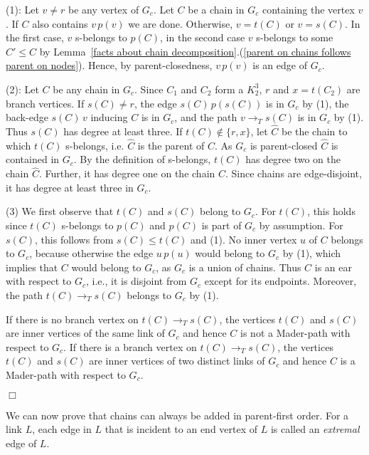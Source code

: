 \documentclass[paper=a4]{scrartcl}
\newcommand{\qed}{}
\newcommand{\mqed}{\hfill$\Box$}
\newlength{\proofpostskipamount}\newlength{\proofpreskipamount}
\newenvironment{proof}{\par\vspace{\proofpreskipamount}\noindent{\textbf{Proof:}}\hspace{0.5em}}{\nopagebreak \strut\nopagebreak \hspace{\fill}\mqed\par\vspace{\proofpostskipamount}\noindent}
\newcommand{\pC}{\widehat{C}}
\newcommand{\sset}[1]{\{ #1 \}}
\newcommand{\edge}[2]{\ensuremath{#1\,#2}}
\begin{document}
\begin{proof}
(1): Let $v \not= r$ be any vertex of $G_c$. Let $C$ be a chain in $G_c$ containing the vertex $v$. If $C$ also contains $\edge{v}{p(v)}$ we are done. Otherwise, $v = t(C)$ or $v = s(C)$. In the first case, $v$ s-belongs to $p(C)$, in the second case $v$ s-belongs to some $C'\leq C$ by Lemma~\ref{facts about chain decomposition}.(\ref{parent on chains follows parent on nodes}). Hence, by parent-closedness, $\edge{v}{p(v)}$ is an edge of $G_c$.

(2): Let $C$ be any chain in $G_c$. Since $C_1$ and $C_2$ form a $K^3_2$, $r$ and $x=t(C_2)$ are branch vertices. If $s(C) \not= r$, the edge $\edge{s(C)}{p(s(C))}$ is in $G_c$ by (1), the back-edge $\edge{s(C)}{v}$ inducing $C$ is in $G_c$, and the path $v \rightarrow_T s(C)$ is in $G_c$ by (1). Thus $s(C)$ has degree at least three. If $t(C) \not\in \sset{r,x}$, let $\pC$ be the chain to which $t(C)$ s-belongs, i.e. $\pC$ is the parent of $C$. As $G_c$ is parent-closed $\pC$ is contained in $G_c$. By the definition of s-belongs, $t(C)$ has degree two on the chain $\pC$. Further, it has degree one on the chain $C$. Since chains are edge-disjoint, it has degree at least three in $G_c$.


(3) We first observe that $t(C)$ and $s(C)$ belong to $G_c$. For $t(C)$, this holds since $t(C)$ s-belongs to $p(C)$ and $p(C)$ is part of $G_c$ by assumption. For $s(C)$, this follows from $s(C) \le t(C)$ and (1). No inner vertex $u$ of $C$ belongs to $G_c$, because otherwise the edge $\edge{u}{p(u)}$ would belong to $G_c$ by (1), which implies that $C$ would belong to $G_c$, as $G_c$ is a union of chains. Thus $C$ is an ear with respect to $G_c$, i.e., it is disjoint from $G_c$ except for its endpoints. Moreover, the path $t(C) \rightarrow_T s(C)$ belongs to $G_c$ by (1).

If there is no branch vertex on $t(C)\rightarrow_T s(C)$, the vertices $t(C)$ and $s(C)$ are inner vertices of the same link of $G_c$ and hence $C$ is not a Mader-path with respect to $G_c$. If there is a branch vertex on $t(C)\rightarrow_T s(C)$, the vertices $t(C)$ and $s(C)$ are inner vertices of two distinct links of $G_c$ and hence $C$ is a Mader-path with respect to $G_c$.
\qed
\end{proof}

We can now prove that chains can always be added in parent-first order. For a link $L$, each edge in $L$ that is incident to an end vertex of $L$ is called an \emph{extremal} edge of $L$.
\end{document}
